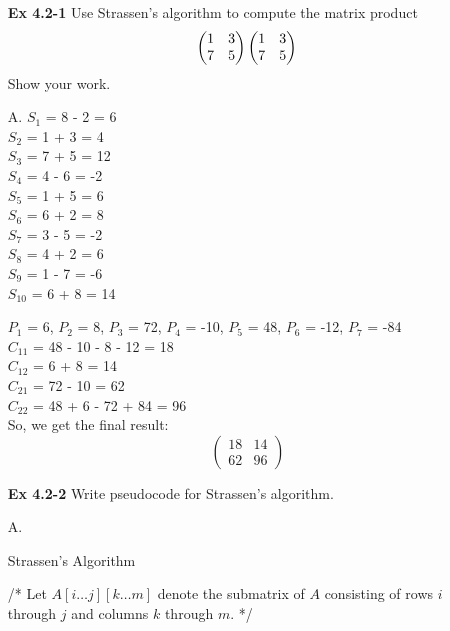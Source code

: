 \documentclass[fontsize=12pt,paper=a4]{book}
\newcommand{\Lcomment}[1]{\Statex /* #1 */}
\begin{document}
\begin{enumerate}
	\item[\textbf{Ex 4.2-1}]
		Use Strassen's algorithm to compute the matrix product\\
			\[			
			\begin{pmatrix}	1 & 3 \\ 7 & 5 \end{pmatrix}
			\begin{pmatrix}	1 & 3 \\ 7 & 5 \end{pmatrix}\\
			\]
		Show your work.
	\item[A.]
		$S_1$ = 8 - 2 = 6\\
		$S_2$ = 1 + 3 = 4\\
		$S_3$ = 7 + 5 = 12\\
		$S_4$ = 4 - 6 = -2\\
		$S_5$ = 1 + 5 = 6\\
		$S_6$ = 6 + 2 = 8\\
		$S_7$ = 3 - 5 = -2\\
		$S_8$ = 4 + 2 = 6\\
		$S_9$ = 1 - 7 = -6\\
		$S_{10}$ = 6 + 8 = 14
		
		$P_1$ = 6, $P_2$ = 8, $P_3$ = 72, 
		$P_4$ = -10, $P_5$ = 48, $P_6$ = -12,
		$P_7$ = -84\\
		
		$C_{11}$ = 48 - 10 - 8 - 12 = 18 \\ 
		$C_{12}$ = 6 + 8 = 14 \\
		$C_{21}$ = 72 - 10 = 62 \\
		$C_{22}$ = 48 + 6 - 72 + 84 = 96 \\
		So, we get the final result:
		\[
		\begin{pmatrix} 18 & 14 \\ 62 & 96 \end{pmatrix}
		\]  
		
	\item[\textbf{Ex 4.2-2}]
		Write pseudocode for Strassen’s algorithm.
	\item[A.]
		\begin{algorithm}
			\caption{Strassen's Algorithm}
			\begin{algorithmic}
					\Lcomment{Let $A[i \dots j][k \dots m]$ denote the submatrix of $A$ consisting of rows $i$ through $j$ and columns $k$ through $m$.}
					

\end{algorithmic}
\end{algorithm}
\end{enumerate}
\end{document}
